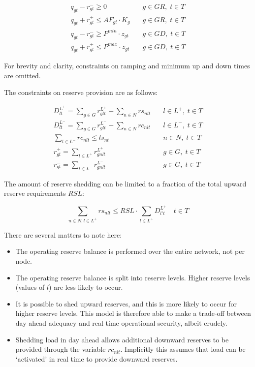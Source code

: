 \documentclass[number,times]{elsarticle}
\begin{document}
\begin{align}
    q_{gt} - r^{-}_{gt} \geq 0                    & \quad g \in GR, \; t \in T \\
    q_{gt} + r^{+}_{gt} \leq AF_{gt} \cdot K_g    & \quad g \in GR, \; t \in T \\
    q_{gt} - r^{-}_{gt} \geq P^{min} \cdot z_{gt} & \quad g \in GD, \; t \in T \\
    q_{gt} + r^{+}_{gt} \leq P^{max} \cdot z_{gt} & \quad g \in GD, \; t \in T
\end{align}

For brevity and clarity, constraints on ramping and minimum up and down times are omitted.

The constraints on reserve provision are as follows:

\begin{align}
    D^{L^+}_{lt} = \sum_{g \in G} r^{L^+}_{glt} + \sum_{n \in N} rs_{nlt} & \quad l \in L^+, \; t \in T \\
    D^{L^-}_{lt} = \sum_{g \in G} r^{L^-}_{glt} + \sum_{n \in N} rc_{nlt} & \quad l \in L^-, \; t \in T \\
    \sum_{l \in L^-} rc_{nlt} \leq ls_{nt}                                & \quad n \in N, \; t \in T   \\
    r^{+}_{gt} = \sum_{l \in L^+} r^{L^+}_{gnlt}                          & \quad g \in G, \; t \in T   \\
    r^{-}_{gt} = \sum_{l \in L^-} r^{L^-}_{gnlt}                          & \quad g \in G, \; t \in T
\end{align}

The amount of reserve shedding can be limited to a fraction of the total upward reserve requirements $RSL$:

\begin{equation}
    \sum_{n \in N, l \in L^+} rs_{nlt} \leq RSL \cdot \sum_{l \in L^+} D^{L^+}_{l't} \quad t \in T
\end{equation}

There are several matters to note here:

\begin{itemize}
    \item The operating reserve balance is performed over the entire network, not per node.
    \item The operating reserve balance is split into reserve levels. Higher reserve levels (values of $l$) are less likely to occur.
    \item It is possible to shed upward reserves, and this is more likely to occur for higher reserve levels. This model is therefore able to make a trade-off between day ahead adequacy and real time operational security, albeit crudely.
    \item Shedding load in day ahead allows additional downward reserves to be provided through the variable $rc_{nlt}$. Implicitly this assumes that load can be `activated' in real time to provide downward reserves.
\end{itemize}
\end{document}
